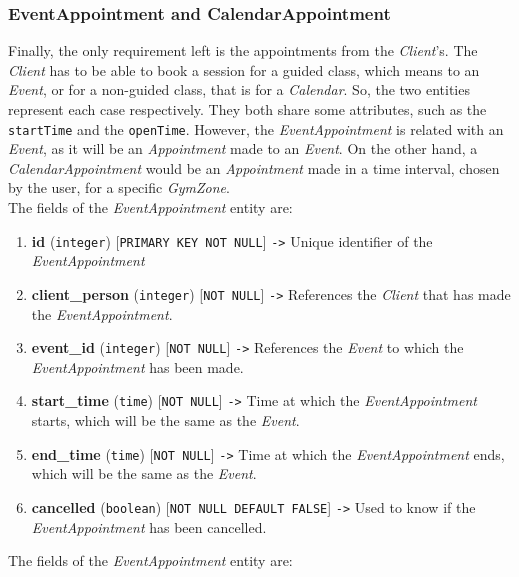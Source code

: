 \documentclass[a4paper, 12pt, oneside]{book}
\begin{document}
\subsubsection{EventAppointment and CalendarAppointment}
Finally, the only requirement left is the appointments from the \emph{Client}'s. The \emph{Client} has to be able to book a session for a guided class, which means to an \emph{Event}, or for a non-guided class, that is for a \emph{Calendar}. So, the two entities represent each case respectively. They both share some attributes, such as the \texttt{startTime} and the \texttt{openTime}. However, the \emph{EventAppointment} is related with an \emph{Event}, as it will be an \emph{Appointment} made to an \emph{Event}. On the other hand, a \emph{CalendarAppointment} would be an \emph{Appointment} made in a time interval, chosen by the user, for a specific \emph{GymZone}.
\\[8pt]
The fields of the \emph{EventAppointment} entity are:
\begin{enumerate}[label = -]
	\item \textbf{id} (\texttt{integer}) [\texttt{PRIMARY KEY NOT NULL}] \texttt{->} Unique identifier of the \emph{EventAppointment}
	\item \textbf{client\_person} (\texttt{integer}) [\texttt{NOT NULL}] \texttt{->} References the \emph{Client} that has made the \emph{EventAppointment}.
	\item \textbf{event\_id} (\texttt{integer}) [\texttt{NOT NULL}] \texttt{->} References the \emph{Event} to which the \emph{EventAppointment} has been made.
	\item \textbf{start\_time} (\texttt{time}) [\texttt{NOT NULL}] \texttt{->} Time at which the \emph{EventAppointment} starts, which will be the same as the \emph{Event}.
	\item \textbf{end\_time} (\texttt{time}) [\texttt{NOT NULL}] \texttt{->} Time at which the \emph{EventAppointment} ends, which will be the same as the \emph{Event}.
	\item \textbf{cancelled} (\texttt{boolean}) [\texttt{NOT NULL DEFAULT FALSE}] \texttt{->} Used to know if the \emph{EventAppointment} has been cancelled.
\end{enumerate}
The fields of the \emph{EventAppointment} entity are:
\end{document}
